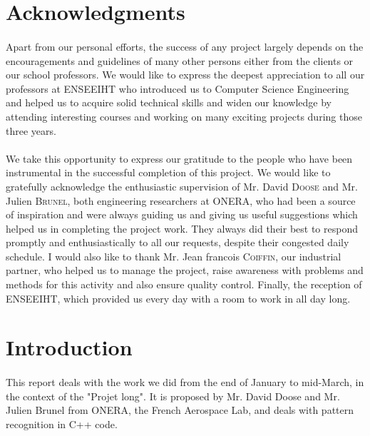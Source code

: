 \documentclass{report}
\begin{document}
\section *{Acknowledgments}
\paragraph{}
\hspace{4mm}Apart from our personal efforts, the success of any project 
largely depends on the encouragements and guidelines of many 
other persons either from the clients or our school professors. We would like to 
express the deepest appreciation to all our professors at ENSEEIHT
 who introduced us to Computer Science Engineering and helped 
us to acquire solid technical skills and widen our knowledge by
 attending interesting courses and working on many exciting 
projects during those three years.

\paragraph{}
\hspace{4mm}We take this opportunity to express our
gratitude to the people who have been instrumental in the 
successful completion of this project. We would like to gratefully 
acknowledge the enthusiastic supervision of Mr. David \textsc{Doose} and
Mr. Julien \textsc{Brunel}, both engineering researchers at ONERA, 
who had been a source of inspiration and were always guiding us 
and giving us useful suggestions which helped us in completing
 the project work. They always did their best to
 respond promptly and enthusiastically to all our requests, 
despite their congested daily schedule. I would also like to thank Mr. Jean francois  \textsc{Coiffin}, our
 industrial partner, who helped us to manage the project, 
raise awareness with problems and methods
for this activity and also ensure quality control. 
Finally, the reception of ENSEEIHT, which provided us every day
with a room to work in all day long.

\newpage
\section *{Introduction}
\paragraph{}
\hspace{4mm}This report deals with the work we did from the end of 
January to mid-March, in the context of the "Projet long". It is proposed by Mr. David
Doose and Mr. Julien Brunel from ONERA, the French Aerospace Lab, 
and deals with pattern recognition in C++ code.
\end{document}

